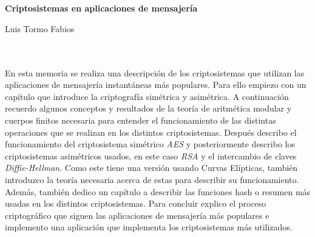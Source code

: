\chapter*{}


%




\begin{center}
{\large\bfseries Criptosistemas en aplicaciones de mensajería}\\
\end{center}
\begin{center}
Luis Tormo Fabios\\
\end{center}

\\

\vspace{0.7cm}
\\

En esta memoria se realiza una descripción de los criptosistemas que utilizan las aplicaciones de mensajería instantáneas más populares. Para ello empiezo con un capítulo que introduce la criptografía simétrica y asimétrica. A continuación recuerdo algunos conceptos y resultados de la teoría de aritmética modular y cuerpos finitos necesaria para entender el funcionamiento de las distintas operaciones que se realizan en los distintos criptosistemas. Después describo el funcionamiento del criptosistema simétrico \emph{AES} y posteriormente describo los criptosistemas asimétricos usados, en este caso \emph{RSA} y el intercambio de claves \emph{Diffie-Hellman}. Como este tiene una versión usando Curvas Elípticas, también introduzco la teoría necesaria acerca de estas para describir su funcionamiento. Además, también dedico un capítulo a describir las funciones hash o resumen más usadas en los distintos criptosistemas. Para concluir explico el proceso criptográfico que siguen las aplicaciones de mensajería más populares e implemento una aplicación que implementa los criptosistemas más utilizados.

\cleardoublepage


